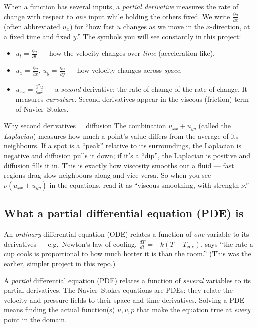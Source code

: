 \documentclass[11pt,a4paper]{article}
\newcommand{\pd}[2]{\frac{\partial #1}{\partial #2}}
\newcommand{\pdd}[2]{\frac{\partial^2 #1}{\partial #2^2}}
\begin{document}
When a function has several inputs, a \emph{partial derivative} measures the
rate of change with respect to \emph{one} input while holding the others fixed.
We write $\pd{u}{x}$ (often abbreviated $u_x$) for ``how fast $u$ changes as we
move in the $x$-direction, at a fixed time and fixed $y$.'' The symbols you will
see constantly in this project:

\begin{itemize}[leftmargin=2em]
  \item $u_t = \pd{u}{t}$ --- how the velocity changes over \emph{time}
        (acceleration-like).
  \item $u_x = \pd{u}{x}$, $u_y = \pd{u}{y}$ --- how velocity changes across
        \emph{space}.
  \item $u_{xx} = \pdd{u}{x}$ --- a \emph{second} derivative: the rate of change
        of the rate of change. It measures \emph{curvature}. Second derivatives
        appear in the viscous (friction) term of Navier--Stokes.
\end{itemize}

\begin{conceptbox}{Why second derivatives = diffusion}
The combination $u_{xx} + u_{yy}$ (called the \emph{Laplacian}) measures how
much a point's value differs from the average of its neighbours. If a spot is a
``peak'' relative to its surroundings, the Laplacian is negative and diffusion
pulls it down; if it's a ``dip'', the Laplacian is positive and diffusion fills
it in. This is exactly how viscosity smooths out a fluid --- fast regions drag
slow neighbours along and vice versa. So when you see $\nu(u_{xx}+u_{yy})$ in
the equations, read it as ``viscous smoothing, with strength $\nu$.''
\end{conceptbox}

\subsection{What a partial differential equation (PDE) is}
\label{sec:pde}

An \emph{ordinary} differential equation (ODE) relates a function of \emph{one}
variable to its derivatives --- e.g.\ Newton's law of cooling,
$\frac{dT}{dt} = -k(T - T_{\text{env}})$, says ``the rate a cup cools is
proportional to how much hotter it is than the room.'' (This was the earlier,
simpler project in this repo.)

A \emph{partial} differential equation (PDE) relates a function of \emph{several}
variables to its partial derivatives. The Navier--Stokes equations are PDEs:
they relate the velocity and pressure fields to their space and time
derivatives. Solving a PDE means finding the actual function(s) $u,v,p$ that
make the equation true at \emph{every} point in the domain.
\end{document}
